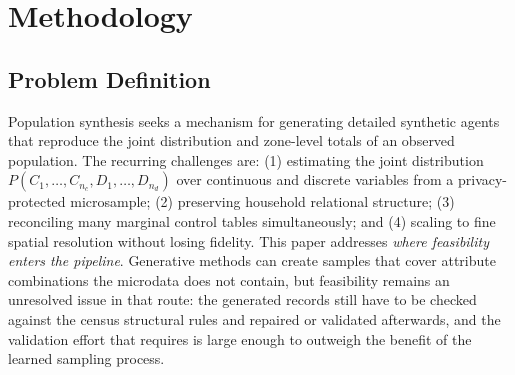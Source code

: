 \documentclass[review]{elsarticle}
\makeatletter
\newcommand{\gls}[1]{\csname acr@#1\endcsname}
\makeatother
\begin{document}
\begin{frontmatter}
\begin{abstract}
The release carries the household travel survey attributes used by the
downstream demand model, validates them against the survey, and includes a
soft-target block for fitting their marginals directly. A downstream
demand-model benchmark checks population scale and trip length against the
survey; mode choice remains a separate calibration task.

The findings demonstrate that synthetic-population quality depends on both
candidate-pool support and fitting performance, and that these should be treated
as separate sources of synthesis error. By making support deficiencies
observable and repairable before fitting, the proposed framework provides a
reproducible approach for improving synthetic population construction and
evaluation.
\end{abstract}

\end{frontmatter}



\section{Methodology}
\label{sec:methodology}

\subsection{Problem Definition}
Population synthesis seeks a mechanism for generating detailed synthetic agents that reproduce the joint distribution and zone-level totals of an observed population. The recurring challenges are: (1) estimating the joint distribution $P(C_1,\dots,C_{n_c},D_1,\dots,D_{n_d})$ over continuous and discrete variables from a privacy-protected microsample; (2) preserving household relational structure; (3) reconciling many marginal control tables simultaneously; and (4) scaling to fine spatial resolution without losing fidelity. This paper addresses \emph{where feasibility enters the pipeline}. Generative methods can create samples that cover attribute combinations the microdata does not contain, but feasibility remains an unresolved issue in that route: the generated records still have to be checked against the census structural rules and repaired or validated afterwards, and the validation effort that requires is large enough to outweigh the benefit of the learned sampling process.

\end{document}
